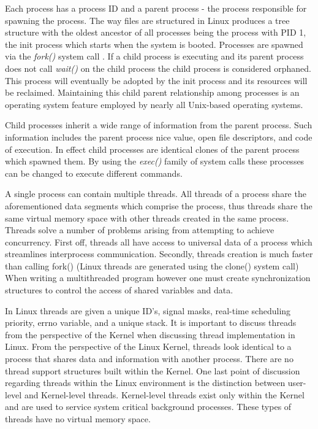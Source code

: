     \normalfont \indent Each process has a process ID and a parent process - the process responsible for spawning the process. The way files are structured in Linux produces a tree structure with the oldest ancestor of all processes being the process with PID 1, the init process which starts when the system is booted. Processes are spawned via the \textit{fork()} system call \cite{linuxProgInterface2010}. If a child process is executing and its parent process does not call \textit{wait()} on the child process the child process is considered orphaned. This process will eventually be adopted by the init process and its resources will be reclaimed. Maintaining this child parent relationship among processes is an operating system feature employed by nearly all Unix-based operating systems.

    \normalfont \indent Child processes inherit a wide range of information from the parent process. Such information includes the parent process nice value, open file descriptors, and code of execution. In effect child processes are identical clones of the parent process which spawned them. By using the \textit{exec()} family of system calls these processes can be changed to execute different commands.

    \normalfont \indent A single process can contain multiple threads. All threads of a process share the aforementioned data segments which comprise the process, thus threads share the same virtual memory space with other threads created in the same process. Threads solve a number of problems arising from attempting to achieve concurrency. First off, threads all have access to universal data of a process which streamlines interprocess communication. Secondly, threads creation is much faster than calling fork() (Linux threads are generated using the clone() system call) When writing a multithreaded program however one must create synchronization structures to control the access of shared variables and data.

    \normalfont \indent In Linux threads are given a unique ID’s, signal masks, real-time scheduling priority, errno variable, and a unique stack. It is important to discuss threads from the perspective of the Kernel when discussing thread implementation in Linux. From the perspective of the Linux Kernel, threads look identical to a process that shares data and information with another process. There are no thread support  structures built within the Kernel. One last point of discussion regarding threads within the Linux environment is the distinction between user-level and Kernel-level threads. Kernel-level threads exist only within the Kernel and are used to service system critical background processes. These types of threads have no virtual  memory space.

